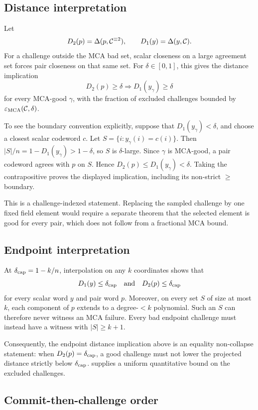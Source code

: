 \subsection{Distance interpretation}

Let
\[
  D_2(p)=\Delta(p,\mathcal C^{\equiv 2}),
  \qquad
  D_1(y)=\Delta(y,\mathcal C).
\]
For a challenge outside the MCA bad set, scalar closeness on a large agreement
set forces pair closeness on that same set. For \(\delta\in[0,1]\), this
gives the distance implication
\[
  D_2(p)\ge\delta
  \Longrightarrow
  D_1(y_\gamma)\ge\delta
\]
for every MCA-good \(\gamma\), with the fraction of excluded challenges bounded
by \(\varepsilon_{\operatorname{MCA}}(\mathcal C,\delta)\).

To see the boundary convention explicitly, suppose that
\(D_1(y_\gamma)<\delta\), and choose a closest scalar codeword \(c\).
Let \(S=\{i:y_\gamma(i)=c(i)\}\). Then
\(|S|/n=1-D_1(y_\gamma)>1-\delta\), so \(S\) is \(\delta\)-large.
Since \(\gamma\) is MCA-good, a pair codeword agrees with \(p\) on
\(S\). Hence \(D_2(p)\le D_1(y_\gamma)<\delta\). Taking the
contrapositive proves the displayed implication, including its non-strict
\(\ge\) boundary.

This is a challenge-indexed statement.  Replacing the sampled challenge by one
fixed field element would require a separate theorem that the selected element
is good for every pair, which does not follow from a fractional MCA bound.

\subsection{Endpoint interpretation}

At \(\delta_{\mathrm{cap}}=1-k/n\), interpolation on any \(k\) coordinates shows that
\[
  D_1(y)\le\delta_{\mathrm{cap}}
  \quad\text{and}\quad
  D_2(p)\le\delta_{\mathrm{cap}}
\]
for every scalar word \(y\) and pair word \(p\).  Moreover, on every set
\(S\) of size at most \(k\), each component of \(p\) extends to a
degree-\(<k\) polynomial.  Such an \(S\) can therefore never witness an MCA
failure.  Every bad endpoint challenge must instead have a witness with
\(|S|\ge k+1\).

Consequently, the endpoint distance implication above is an equality
non-collapse statement: when \(D_2(p)=\delta_{\mathrm{cap}}\), a good challenge must not
lower the projected distance strictly below \(\delta_{\mathrm{cap}}\).
 supplies a uniform quantitative bound on the
excluded challenges.

\subsection{Commit-then-challenge order}

